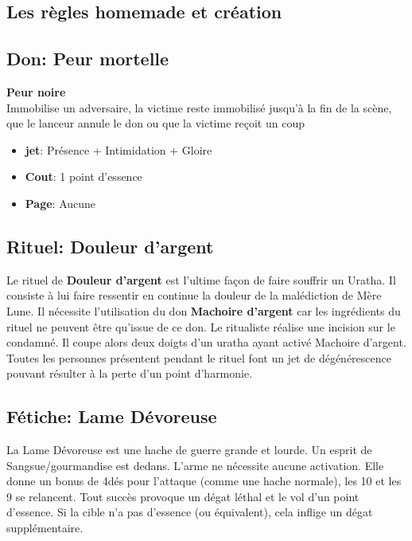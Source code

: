 \documentclass[oneside,12pt]{book}
\newcommand\don[5]{
\textbf{#1} \\
#2
\begin{itemize}
\item{ \textbf{jet}: #3}
\item{ \textbf{Cout}: #4}
\item{ \textbf{Page}: #5}
\end{itemize}
\vspace{0.5cm}
}
\begin{document}
\begin{flushleft}
\clearpage

\section{Les règles homemade et création}
\subsection{Don: Peur mortelle}
\label{Peur_mortelle}
\don{Peur noire}{Immobilise un adversaire, la victime reste immobilisé jusqu'à la fin de la scène, que le lanceur annule le don ou que la victime reçoit un coup}{Présence + Intimidation + Gloire}{1 point d'essence}{Aucune}
\subsection{Rituel: Douleur d'argent}
Le rituel de \textbf{Douleur d'argent} est l'ultime façon de faire souffrir un Uratha. Il consiste à lui faire ressentir en continue la douleur de la malédiction de Mère Lune.
Il nécessite l'utilisation du don \textbf{Machoire d'argent} car les ingrédients du rituel ne peuvent être qu'issue de ce don. Le ritualiste réalise une incision sur le condamné. Il coupe alors deux doigts d'un uratha ayant activé {Machoire d'argent}. Toutes les personnes présentent pendant le rituel font un jet de dégénérescence pouvant résulter à la perte d'un point d'harmonie.
\subsection{Fétiche: Lame Dévoreuse}
\label{devoreuse}
La Lame Dévoreuse est une hache de guerre grande et lourde. Un esprit de Sangsue/gourmandise est dedans. L'arme ne nécessite aucune activation. Elle donne un bonus de 4dés pour l'attaque (comme une hache normale), les 10 et les 9 se relancent. Tout succès provoque un dégat léthal et le vol d'un point d'essence. Si la cible n'a pas d'essence (ou équivalent), cela inflige un dégat supplémentaire.    

\end{flushleft}
\end{document}
